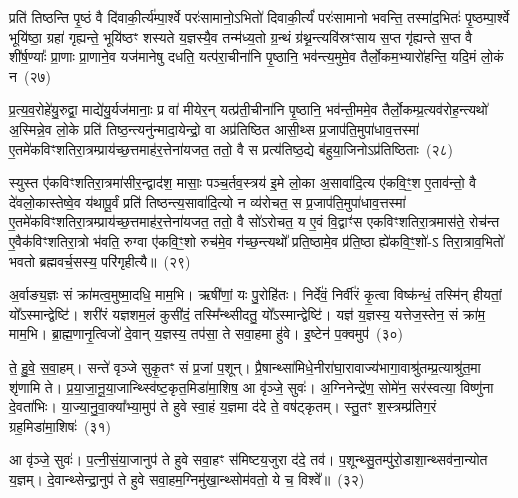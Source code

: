 प्रति॑ तिष्ठन्ति पृ॒ष्ठं वै दि॑वाकी॒र्त्य॑म्पा॒र्श्वे परः॑सामानो॒\-ऽभितो॑ दिवाकी॒र्त्यं॑ परः॑सामानो भवन्ति॒ तस्मा॑द॒भितः॑ पृ॒ष्ठम्पा॒र्श्वे भूयि॑ष्ठा॒ ग्रहा॑ गृह्यन्ते॒ भूयि॑ष्ठꣳ शस्यते य॒ज्ञस्यै॒व तन्म॑ध्य॒तो ग्र॒न्थं ग्र॑थ्न॒न्त्यवि॑स्रꣳसाय स॒प्त गृ॑ह्यन्ते स॒प्त वै शी॑र्\mbox{}ष॒ण्याः᳚ प्रा॒णाः प्रा॒णाने॒व यज॑मानेषु दधति॒ यत्प॑रा॒चीना॑नि पृ॒ष्ठानि॒ भव॑न्त्य॒मुमे॒व तैर्लो॒कम॒भ्यारो॑हन्ति॒ यदि॒मं लो॒कं न~(२७)

प्र॒त्य॒व॒रोहे॑यु॒रुद्वा॒ माद्ये॑यु॒र्यज॑मानाः॒ प्र वा॑ मीयेर॒न् यत्प्र॑ती॒चीना॑नि पृ॒ष्ठानि॒ भव॑न्ती॒ममे॒व तैर्लो॒कम्प्र॒त्यव॑रोह॒न्त्यथो॑ अ॒स्मिन्ने॒व लो॒के प्रति॑ तिष्ठ॒न्त्यनु॑न्मादा॒येन्द्रो॒ वा अप्र॑तिष्ठित आसी॒थ्स प्र॒जा\-प॑ति॒मुपा॑धाव॒त्तस्मा॑ ए॒तमे॑कविꣳशतिरा॒त्रम्प्राय॑च्छ॒त्तमाह॑र॒त्तेना॑यजत॒ ततो॒ वै स प्रत्य॑तिष्ठ॒द्ये ब॑हुया॒जिनो\-ऽप्र॑तिष्ठिताः~(२८)

स्युस्त ए॑कविꣳशतिरा॒त्रमा॑सीर॒न्द्वाद॑श॒ मासाः॒ पञ्च॒र्तव॒स्त्रय॑ इ॒मे लो॒का अ॒सावा॑दि॒त्य ए॑कवि॒ꣳ॒श ए॒ताव॑न्तो॒ वै दे॑वलो॒कास्तेष्वे॒व य॑थापू॒र्वं प्रति॑ तिष्ठन्त्य॒सावा॑दि॒त्यो न व्य॑रोचत॒ स प्र॒जा\-प॑ति॒मुपा॑धाव॒त्तस्मा॑ ए॒तमे॑कविꣳशति\-रा॒त्रम्प्राय॑च्छ॒त्तमाह॑र॒त्तेना॑यजत॒ ततो॒ वै सो॑\-ऽरोचत॒ य ए॒वं वि॒द्वाꣳ॑स एकविꣳशतिरा॒त्रमास॑ते॒ रोच॑न्त ए॒वैक॑विꣳशतिरा॒त्रो भ॑वति॒ रुग्वा ए॑कवि॒ꣳ॒शो रुच॑मे॒व ग॑च्छ॒न्त्यथो᳚ प्रति॒ष्ठामे॒व प्र॑ति॒ष्ठा ह्ये॑कवि॒ꣳ॒शो॑-\-ऽ तिरा॒त्राव॒भितो॑ भवतो ब्रह्मवर्च॒सस्य॒ परि॑गृहीत्यै॥~(२९)

{\anuvakamend[{गृ॒ह्ण॒न्ति॒ दि॒वा॒की॒र्त्ये॑नै॒वोभ॒यतो॒ नाप्र॑तिष्ठिता॒ आस॑त॒ एक॑विꣳशतिश्च}]}%

अ॒र्वाङ्य॒ज्ञः सं क्रा॑मत्व॒मुष्मा॒दधि॒ माम॒भि। ऋषी॑णां॒ यः पु॒रोहि॑तः। निर्दे॑वं॒ निर्वी॑रं कृ॒त्वा विष्क॑न्धं॒ तस्मि॑न् हीयतां॒ यो᳚\-ऽस्मान्द्वेष्टि॑। शरी॑रं यज्ञशम॒लं कुसी॑दं॒ तस्मि᳚न्थ्सीदतु॒ यो᳚\-ऽस्मान्द्वेष्टि॑। यज्ञ॑ य॒ज्ञस्य॒ यत्तेज॒स्तेन॒ सं क्रा॑म॒ माम॒भि। ब्रा॒ह्म॒णानृ॒त्विजो॑ दे॒वान् य॒ज्ञस्य॒ तप॑सा॒ ते सवा॒हमा हु॑वे। इ॒ष्टेन॑ प॒क्वमुप॑~(३०)

ते॒ हु॒वे॒ स॒वा॒हम्। सन्ते॑ वृञ्जे सुकृ॒तꣳ सं प्र॒जां प॒शून्। प्रै॒षान्थ्सा॑मिधे॒नीरा॑घा॒रावाज्य॑भागा॒वाश्रु॑तम्प्र॒त्याश्रु॑त॒मा शृ॑णामि ते। प्र॒या॒जा॒नू॒या॒जान्थ्स्वि॑ष्ट॒कृत॒मिडा॑मा॒शिष॒ आ वृ॑ञ्जे॒ सुवः॑। अ॒ग्निनेन्द्रे॑ण॒ सोमे॑न॒ सर॑स्वत्या॒ विष्णु॑ना दे॒वता॑भिः। या॒ज्या॒नु॒वा॒क्या᳚भ्या॒मुप॑ ते हुवे स्वा॒हं य॒ज्ञमा द॑दे ते॒ वष॑ट्कृतम्। स्तु॒तꣳ श॒स्त्रम्प्र॑तिग॒रं ग्रह॒मिडा॑मा॒शिषः॑~(३१)

आ वृ॑ञ्जे॒ सुवः॑। प॒त्नी॒सं॒या॒जानुप॑ ते हुवे सवा॒हꣳ स॑मिष्टय॒जुरा द॑दे॒ तव॑। प॒शून्थ्सु॒तम्पु॑रो॒डाशा॒न्थ्सव॑ना॒न्योत य॒ज्ञम्। दे॒वान्थ्सेन्द्रा॒नुप॑ ते हुवे सवा॒हम॒ग्निमु॑खा॒न्थ्सोम॑वतो॒ ये च॒ विश्वे᳚॥~(३२)

